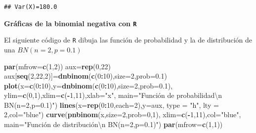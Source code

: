 \documentclass[]{book}
\newenvironment{Shaded}{\begin{snugshade}}{\end{snugshade}}
\newcommand{\CharTok}[1]{\textcolor[rgb]{0.31,0.60,0.02}{#1}}
\newcommand{\DataTypeTok}[1]{\textcolor[rgb]{0.13,0.29,0.53}{#1}}
\newcommand{\DecValTok}[1]{\textcolor[rgb]{0.00,0.00,0.81}{#1}}
\newcommand{\FloatTok}[1]{\textcolor[rgb]{0.00,0.00,0.81}{#1}}
\newcommand{\KeywordTok}[1]{\textcolor[rgb]{0.13,0.29,0.53}{\textbf{#1}}}
\newcommand{\NormalTok}[1]{#1}
\newcommand{\OperatorTok}[1]{\textcolor[rgb]{0.81,0.36,0.00}{\textbf{#1}}}
\newcommand{\StringTok}[1]{\textcolor[rgb]{0.31,0.60,0.02}{#1}}
\begin{document}
\begin{verbatim}
## Var(X)=180.0
\end{verbatim}

\textbf{Gráficas de la binomial negativa con \texttt{R}}

El siguiente código de \texttt{R} dibuja las función de probabilidad y la de distribución de una \(BN(n=2,p=0.1)\)

\begin{Shaded}
\begin{Highlighting}[]
\KeywordTok{par}\NormalTok{(}\DataTypeTok{mfrow=}\KeywordTok{c}\NormalTok{(}\DecValTok{1}\NormalTok{,}\DecValTok{2}\NormalTok{))}
\NormalTok{aux=}\KeywordTok{rep}\NormalTok{(}\DecValTok{0}\NormalTok{,}\DecValTok{22}\NormalTok{)}
\NormalTok{aux[}\KeywordTok{seq}\NormalTok{(}\DecValTok{2}\NormalTok{,}\DecValTok{22}\NormalTok{,}\DecValTok{2}\NormalTok{)]=}\KeywordTok{dnbinom}\NormalTok{(}\KeywordTok{c}\NormalTok{(}\DecValTok{0}\OperatorTok{:}\DecValTok{10}\NormalTok{),}\DataTypeTok{size=}\DecValTok{2}\NormalTok{,}\DataTypeTok{prob=}\FloatTok{0.1}\NormalTok{)}
\KeywordTok{plot}\NormalTok{(}\DataTypeTok{x=}\KeywordTok{c}\NormalTok{(}\DecValTok{0}\OperatorTok{:}\DecValTok{10}\NormalTok{),}\DataTypeTok{y=}\KeywordTok{dnbinom}\NormalTok{(}\KeywordTok{c}\NormalTok{(}\DecValTok{0}\OperatorTok{:}\DecValTok{10}\NormalTok{),}\DataTypeTok{size=}\DecValTok{2}\NormalTok{,}\DataTypeTok{prob=}\FloatTok{0.1}\NormalTok{),}
  \DataTypeTok{ylim=}\KeywordTok{c}\NormalTok{(}\DecValTok{0}\NormalTok{,}\DecValTok{1}\NormalTok{),}\DataTypeTok{xlim=}\KeywordTok{c}\NormalTok{(}\OperatorTok{-}\DecValTok{1}\NormalTok{,}\DecValTok{11}\NormalTok{),}\DataTypeTok{xlab=}\StringTok{"x"}\NormalTok{,}
  \DataTypeTok{main=}\StringTok{"Función de probabilidad}\CharTok{\textbackslash{}n}\StringTok{ BN(n=2,p=0.1)"}\NormalTok{)}
\KeywordTok{lines}\NormalTok{(}\DataTypeTok{x=}\KeywordTok{rep}\NormalTok{(}\DecValTok{0}\OperatorTok{:}\DecValTok{10}\NormalTok{,}\DataTypeTok{each=}\DecValTok{2}\NormalTok{),}\DataTypeTok{y=}\NormalTok{aux, }\DataTypeTok{type =} \StringTok{"h"}\NormalTok{, }\DataTypeTok{lty =} \DecValTok{2}\NormalTok{,}\DataTypeTok{col=}\StringTok{"blue"}\NormalTok{)}
\KeywordTok{curve}\NormalTok{(}\KeywordTok{pnbinom}\NormalTok{(x,}\DataTypeTok{size=}\DecValTok{2}\NormalTok{,}\DataTypeTok{prob=}\DecValTok{0}\NormalTok{,}\DecValTok{1}\NormalTok{),}
  \DataTypeTok{xlim=}\KeywordTok{c}\NormalTok{(}\OperatorTok{-}\DecValTok{1}\NormalTok{,}\DecValTok{11}\NormalTok{),}\DataTypeTok{col=}\StringTok{"blue"}\NormalTok{,}
  \DataTypeTok{main=}\StringTok{"Función de distribución\textbackslash{}n BN(n=2,p=0.1)"}\NormalTok{)}
\KeywordTok{par}\NormalTok{(}\DataTypeTok{mfrow=}\KeywordTok{c}\NormalTok{(}\DecValTok{1}\NormalTok{,}\DecValTok{1}\NormalTok{))}
\end{Highlighting}
\end{Shaded}
\end{document}
